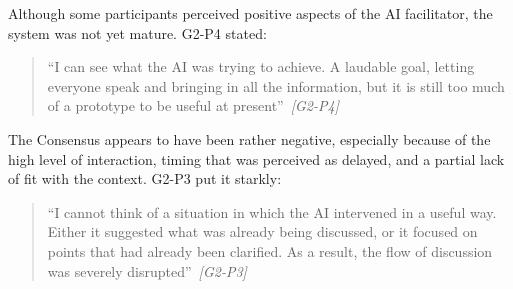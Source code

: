 Although some participants perceived positive aspects of the AI facilitator, the system was not yet mature.
G2-P4 stated:
{\setlength{\topsep}{0.25\baselineskip}\setlength{\partopsep}{0pt}%
  \begin{quote}\small
    \enquote{I can see what the AI was trying to achieve. A laudable goal, letting everyone speak
      and bringing in all the information, but it is still too much of a prototype to be
    useful at present}~\textit{\scriptsize[G2-P4]}
\end{quote}}

The Consensus appears to have been rather negative, especially because of the high level of interaction, timing that was
perceived as delayed, and a partial lack of fit with the context.
G2-P3 put it starkly:
{\setlength{\topsep}{0.25\baselineskip}\setlength{\partopsep}{0pt}%
  \begin{quote}\small
    \enquote{I cannot think of a situation in which the AI intervened in a useful way. Either it
      suggested what was already being discussed, or it focused on points that had already been
      clarified. As a result, the flow of discussion was severely
    disrupted}~\textit{\scriptsize[G2-P3]}
\end{quote}}
